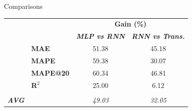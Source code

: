 \begin{frame}{Comparisons}
	\centering
	\begin{tabular}{cl|c|c}
		                      & \multicolumn{1}{c}{} & \multicolumn{2}{c}{\textbf{Gain (\%)}}                                   \\
		                      &                      & \textbf{\textit{ MLP vs RNN}}          & \textbf{\textit{RNN vs Trans.}} \\
		\cline{2-4}
		                      & \textbf{MAE}         & 51.38                                  & 45.18                           \\
		\cline{2-4}
		                      & \textbf{MAPE}        & 59.38                                  & 30.07                           \\
		\cline{2-4}
		                      & \textbf{MAPE@20}     & 60.34                                  & 46.81                           \\
		\cline{2-4}
		                      & \textbf{R$^2$}       & 25.00                                  & 6.12                            \\
		\multicolumn{4}{c}{}                                                                                                    \\
		\hline
		\textbf{\textit{AVG}} &                      & \textit{49.03}                         & \textit{32.05}
	\end{tabular}
\end{frame}